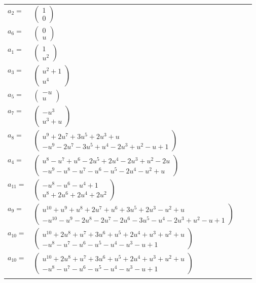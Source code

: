 \documentclass[1p]{elsarticle_modified}
\theoremstyle{definition}
\begin{document}
\begin{tabular}{m{7pt} m{180pt} m{7pt} m{180pt} }
\flushright $a_{2}=$&$\begin{pmatrix}1\\0\end{pmatrix}$ \\
\flushright $a_{6}=$&$\begin{pmatrix}0\\u\end{pmatrix}$ \\
\flushright $a_{1}=$&$\begin{pmatrix}1\\u^2\end{pmatrix}$ \\
\flushright $a_{3}=$&$\begin{pmatrix}u^2+1\\u^4\end{pmatrix}$ \\
\flushright $a_{5}=$&$\begin{pmatrix}- u\\u\end{pmatrix}$ \\
\flushright $a_{7}=$&$\begin{pmatrix}- u^3\\u^3+u\end{pmatrix}$ \\
\flushright $a_{8}=$&$\begin{pmatrix}u^9+2 u^7+3 u^5+2 u^3+u\\- u^9-2 u^7-3 u^5+u^4-2 u^3+u^2- u+1\end{pmatrix}$ \\
\flushright $a_{4}=$&$\begin{pmatrix}u^8- u^7+u^6-2 u^5+2 u^4-2 u^3+u^2-2 u\\- u^9- u^8- u^7- u^6- u^5-2 u^4- u^2+u\end{pmatrix}$ \\
\flushright $a_{11}=$&$\begin{pmatrix}- u^8- u^6- u^4+1\\u^8+2 u^6+2 u^4+2 u^2\end{pmatrix}$ \\
\flushright $a_{9}=$&$\begin{pmatrix}u^{10}+u^9+u^8+2 u^7+u^6+3 u^5+2 u^3- u^2+u\\- u^{10}- u^9-2 u^8-2 u^7-2 u^6-3 u^5- u^4-2 u^3+u^2- u+1\end{pmatrix}$ \\
\flushright $a_{10}=$&$\begin{pmatrix}u^{10}+2 u^8+u^7+3 u^6+u^5+2 u^4+u^3+u^2+u\\- u^8- u^7- u^6- u^5- u^4- u^3- u+1\end{pmatrix}$\\ \flushright $a_{10}=$&$\begin{pmatrix}u^{10}+2 u^8+u^7+3 u^6+u^5+2 u^4+u^3+u^2+u\\- u^8- u^7- u^6- u^5- u^4- u^3- u+1\end{pmatrix}$\\&\end{tabular}
\end{document}
